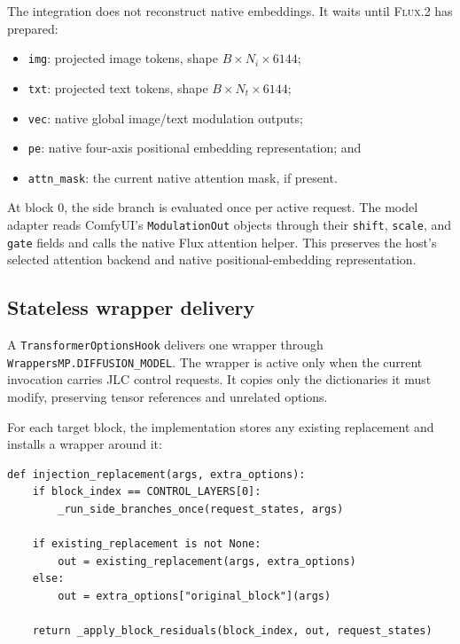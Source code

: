 \documentclass[11pt]{article}
\newcommand{\FluxTwo}{\textsc{Flux.2}}
\newcommand{\JLC}{\textsc{JLC}}
\newcommand{\code}[1]{\texttt{#1}}
\begin{document}
The integration does not reconstruct native embeddings. It waits until \FluxTwo{} has prepared:

\begin{itemize}
  \item \code{img}: projected image tokens, shape $B\times N_i\times6144$;
  \item \code{txt}: projected text tokens, shape $B\times N_t\times6144$;
  \item \code{vec}: native global image/text modulation outputs;
  \item \code{pe}: native four-axis positional embedding representation; and
  \item \code{attn\_mask}: the current native attention mask, if present.
\end{itemize}

At block 0, the side branch is evaluated once per active request. The model adapter reads ComfyUI's \code{ModulationOut} objects through their \code{shift}, \code{scale}, and \code{gate} fields and calls the native Flux attention helper. This preserves the host's selected attention backend and native positional-embedding representation.

\subsection{Stateless wrapper delivery}

A \code{TransformerOptionsHook} delivers one wrapper through \code{WrappersMP.DIFFUSION\_MODEL}. The wrapper is active only when the current invocation carries \JLC{} control requests. It copies only the dictionaries it must modify, preserving tensor references and unrelated options.

For each target block, the implementation stores any existing replacement and installs a wrapper around it:

\begin{lstlisting}[style=pythonstyle,caption={Composition-safe native block replacement.}]
def injection_replacement(args, extra_options):
    if block_index == CONTROL_LAYERS[0]:
        _run_side_branches_once(request_states, args)

    if existing_replacement is not None:
        out = existing_replacement(args, extra_options)
    else:
        out = extra_options["original_block"](args)

    return _apply_block_residuals(block_index, out, request_states)
\end{lstlisting}
\end{document}
